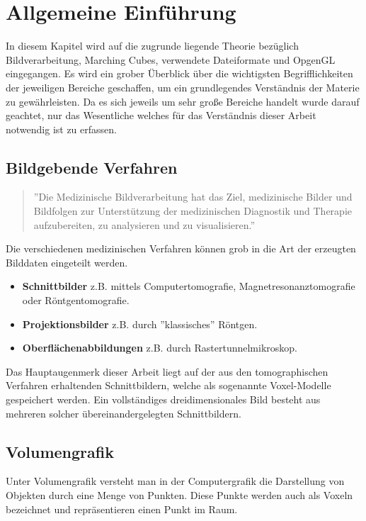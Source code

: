 \chapter{Allgemeine Einführung}
In diesem Kapitel wird auf die zugrunde liegende Theorie bezüglich Bildverarbeitung, Marching Cubes, verwendete Dateiformate und OpgenGL eingegangen. Es wird ein grober Überblick über die wichtigsten Begrifflichkeiten der jeweiligen Bereiche geschaffen, um ein grundlegendes Verständnis der Materie zu gewährleisten. Da es sich jeweils um sehr große Bereiche handelt wurde darauf geachtet, nur das Wesentliche welches für das Verständnis dieser Arbeit notwendig ist zu erfassen.
\section{Bildgebende Verfahren}
\begin{quote}
	''Die Medizinische Bildverarbeitung hat das Ziel, medizinische Bilder und Bildfolgen zur Unterstützung der medizinischen Diagnostik und Therapie aufzubereiten, zu analysieren und zu visualisieren.'' \citep{MedBildVerarbeitung}\\
\end{quote}
Die verschiedenen medizinischen Verfahren können grob in die Art der erzeugten Bilddaten eingeteilt werden.\\
\begin{itemize}
	\item \textbf{Schnittbilder} z.B. mittels Computertomografie, Magnetresonanztomografie oder Röntgentomografie.
	\item \textbf{Projektionsbilder} z.B. durch ''klassisches'' Röntgen.
	\item \textbf{Oberflächenabbildungen} z.B. durch Rastertunnelmikroskop.\\
\end{itemize}
Das Hauptaugenmerk dieser Arbeit liegt auf der aus den tomographischen Verfahren erhaltenden Schnittbildern, welche als sogenannte Voxel-Modelle gespeichert werden. Ein vollständiges dreidimensionales Bild besteht aus mehreren solcher übereinandergelegten Schnittbildern.

\section{Volumengrafik}
Unter Volumengrafik versteht man in der Computergrafik die Darstellung von Objekten durch eine Menge von Punkten. Diese Punkte werden auch als Voxeln bezeichnet und repräsentieren einen Punkt im Raum.
